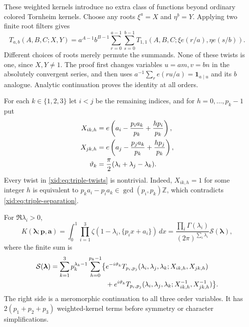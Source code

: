 These weighted kernels introduce no extra class of functions beyond
ordinary colored Tornheim kernels.  Choose any roots $\xi^a=X$ and
$\eta^b=Y$.  Applying two finite root filters gives
\begin{equation}\label{xid:eq:weighted-T-reduction}
 T_{a,b}(A,B,C;X,Y)
 =a^{A-1}b^{B-1}
 \sum_{r=0}^{a-1}\sum_{s=0}^{b-1}
 T_{1,1}(A,B,C;\xi e(r/a),\eta e(s/b)).
\end{equation}
Different choices of roots merely permute the summands.  None of
these twists is one, since $X,Y\ne1$.  The proof first changes
variables $u=am,v=bn$ in the absolutely convergent series, and then
uses $a^{-1}\sum_r e(ru/a)=\mathbf1_{a\mid u}$ and its $b$ analogue.
Analytic continuation proves the identity at all orders.

For each $k\in\{1,2,3\}$ let $i<j$ be the remaining indices, and
for $h=0,\ldots,p_k-1$ put
\begin{align}
 X_{ik,h}&=e\left(a_i-\frac{p_i a_k}{p_k}
                              +\frac{hp_i}{p_k}\right),\notag\\
 X_{jk,h}&=e\left(a_j-\frac{p_j a_k}{p_k}
                              +\frac{hp_j}{p_k}\right),\label{xid:eq:triple-twists}\\
 \vartheta_k&=\frac\pi2(\lambda_i+\lambda_j-\lambda_k).
 \notag
\end{align}
Every twist in \eqref{xid:eq:triple-twists} is nontrivial.  Indeed,
$X_{ik,h}=1$ for some integer $h$ is equivalent to
$p_k a_i-p_i a_k\in\gcd(p_i,p_k)\mathbb Z$, which contradicts
\eqref{xid:eq:triple-separation}.

\begin{theorem}
\label{xid:thm:triple-spectral}
For $\Re\lambda_i>0$,
\begin{equation}\label{xid:eq:triple-K}
 K(\boldsymbol\lambda;\boldsymbol p,\boldsymbol a)
 =\int_0^1\prod_{i=1}^3
       \zeta(1-\lambda_i,\{p_i x+a_i\})\,dx
 =\frac{\prod_i\Gamma(\lambda_i)}{(2\pi)^{\sum_i\lambda_i}}
       \mathcal S(\boldsymbol\lambda),
\end{equation}
where the finite sum is
\begin{align}
 \mathcal S(\boldsymbol\lambda)
 =\sum_{k=1}^3p_k^{\lambda_k-1}\sum_{h=0}^{p_k-1}
 \bigl\{&e^{-i\vartheta_k}
 T_{p_i,p_j}(\lambda_i,\lambda_j,\lambda_k;
                         X_{ik,h},X_{jk,h})\notag\\
 &+e^{i\vartheta_k}
 T_{p_i,p_j}(\lambda_i,\lambda_j,\lambda_k;
                         X_{ik,h}^{-1},X_{jk,h}^{-1})\bigr\}.
 \label{xid:eq:triple-cones}
\end{align}
The right side is a meromorphic continuation to all three order
variables.  It has $2(p_1+p_2+p_3)$ weighted-kernel terms before
symmetry or character simplifications.
\end{theorem}

